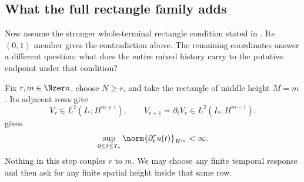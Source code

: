 \subsection{What the full rectangle family adds}\label{sub:FullRectangleFamilyAdds}

Now assume the stronger whole-terminal rectangle condition stated in
.
Its \((0,1)\) member gives the contradiction above.
The remaining coordinates answer a different question: what does the entire mixed
history carry to the putative endpoint under that condition?

Fix
\(r,m\in\Nzero\), choose \(N\geq r\), and take the rectangle of middle height
\(M=m\).  Its adjacent rows give
\[
  V_r\in L^2(I_*;H^{m+1}),
  \qquad
  V_{r+1}=\partial_tV_r\in L^2(I_*;H^{m-1}).
\]
 gives
\begin{equation}\label{eq:BodyUniformMixedSobolevCoordinate}
  \sup_{0\leq t\leq T_*}
  \norm{\partial_t^ru(t)}_{H^m}
  <\infty.
\end{equation}
Nothing in this step couples \(r\) to \(m\).  We may choose any finite temporal
response and then ask for any finite spatial height inside that same row.

